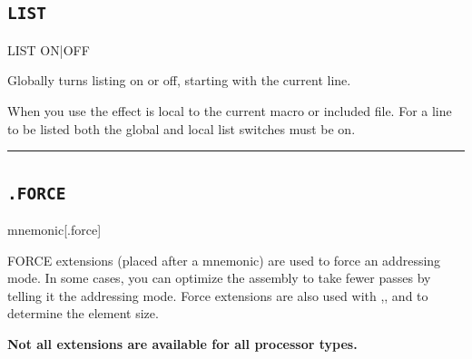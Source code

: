 \subsection{\texttt{LIST}}
\label{pseudoop:list}

\begin{usage}
  LIST ON|OFF
\end{usage}

Globally turns listing on or off, starting with the current
line.

When you use  the effect is local to the
current macro or included file. For a line to be listed both
the global and local list switches must be on.\\

\hrule


\subsection{\texttt{.FORCE}}
\label{pseudoop:force}

\begin{usage}
  mnemonic[.force]
\end{usage}

FORCE extensions (placed after a mnemonic) are used to force an addressing mode.  In some cases,
you can optimize the assembly to take fewer passes by telling it the
addressing mode.  Force extensions are also used with ,, and 
to determine the element size.

\textbf{Not all extensions are available for all processor types.}

